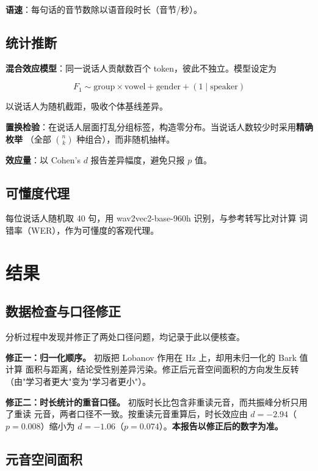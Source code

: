 \documentclass[11pt,a4paper]{ctexart}
\begin{document}
\textbf{语速}：每句话的音节数除以语音段时长（音节/秒）。

\subsection{统计推断}

\textbf{混合效应模型}：同一说话人贡献数百个 token，彼此不独立。模型设定为

\begin{equation}
F_1 \sim \text{group} \times \text{vowel} + \text{gender} + (1 \mid \text{speaker})
\end{equation}

以说话人为随机截距，吸收个体基线差异。

\textbf{置换检验}：在说话人层面打乱分组标签，构造零分布。当说话人数较少时采用\textbf{精确枚举}
（全部 $\binom{n}{k}$ 种组合），而非随机抽样。

\textbf{效应量}：以 Cohen's $d$ 报告差异幅度，避免只报 $p$ 值。

\subsection{可懂度代理}

每位说话人随机取 40 句，用 wav2vec2-base-960h \cite{wav2vec2} 识别，与参考转写比对计算
词错率（WER），作为可懂度的客观代理。

\section{结果}

\subsection{数据检查与口径修正}

分析过程中发现并修正了两处口径问题，均记录于此以便核查。

\textbf{修正一：归一化顺序。} 初版把 Lobanov 作用在 Hz 上，却用未归一化的 Bark 值计算
面积与距离，结论受性别差异污染。修正后元音空间面积的方向发生反转
（由"学习者更大"变为"学习者更小"）。

\textbf{修正二：时长统计的重音口径。} 初版时长比包含非重读元音，而共振峰分析只用了重读
元音，两者口径不一致。按重读元音重算后，时长效应由 $d=-2.94$（$p=0.008$）缩小为
$d=-1.06$（$p=0.074$）。\textbf{本报告以修正后的数字为准。}

\subsection{元音空间面积}
\end{document}
